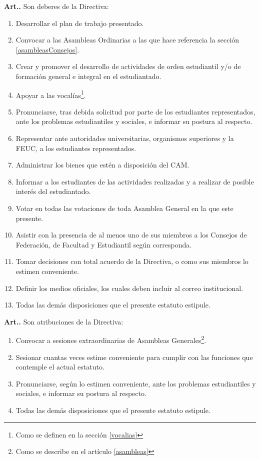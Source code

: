 \documentclass[letterpaper,11pt]{article}
\newcounter{art}
\newenvironment{art}{\refstepcounter{art}\textbf{Art.{\space}\theart.}}{}
\begin{document}
\begin{art}\label{deberesDirectiva}
    Son deberes de la Directiva:
    \begin{enumerate}
        \item Desarrollar el plan de trabajo presentado.
        \item Convocar a las Asambleas Ordinarias a las que hace referencia la sección \ref{asambleasConsejos}.
        \item Crear y promover el desarrollo de actividades de orden estudiantil y/o de formación general e integral en el estudiantado.
        \item Apoyar a las vocalías\footnote{Como se definen en la sección \ref{vocalias}}.
        \item Pronunciarse, tras debida solicitud por parte de los estudiantes representados, ante los problemas estudiantiles y sociales, e informar su postura al respecto.
        \item Representar ante autoridades universitarias, organismos superiores y la FEUC, a los estudiantes representados.
        \item Administrar los bienes que estén a disposición del CAM.
        \item Informar a los estudiantes de las actividades realizadas y a realizar de posible interés del estudiantado.
        \item Votar en todas las votaciones de toda Asamblea General en la que este presente.
        \item Asistir con la presencia de al menos uno de sus miembros a los Consejos de Federación, de Facultad y Estudiantil según corresponda.
        \item Tomar decisiones con total acuerdo de la Directiva, o como sus miembros lo estimen conveniente.
        \item Definir los medios oficiales, los cuales deben incluir al correo institucional.
        \item Todas las demás disposiciones que el presente estatuto estipule.
    \end{enumerate}
\end{art}

\begin{art}\label{atribucionesDirectiva}
    Son atribuciones de la Directiva:
    \begin{enumerate}
        \item Convocar a sesiones extraordinarias de Asambleas Generales\footnote{Como se describe en el artículo \ref{asambleas}}.
        \item Sesionar cuantas veces estime conveniente para cumplir con las funciones que contemple el actual estatuto.
        \item Pronunciarse, según lo estimen conveniente, ante los problemas estudiantiles y sociales, e informar su postura al respecto.
        \item Todas las demás disposiciones que el presente estatuto estipule.
    \end{enumerate}
\end{art}
\end{document}
